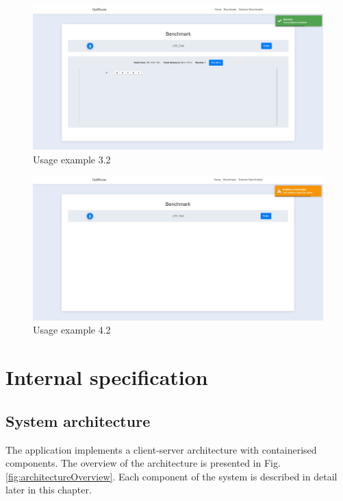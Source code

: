 \documentclass[a4paper,twoside,12pt]{book}
\begin{document}
\begin{figure}[htbp]
\centering
\includegraphics[width=\textwidth]{images/benchmarkSuccess.jpg}
\caption{Usage example 3.2}
\label{fig:benchmarkSuccess}
\end{figure}

\begin{figure}[htbp]
\centering
\includegraphics[width=\textwidth]{images/benchmarkFailed.jpg}
\caption{Usage example 4.2}
\label{fig:benchmarkFailed}
\end{figure}


\chapter{Internal specification}

\section{System architecture}
The application implements a client-server architecture with containerised components. The overview of the architecture is presented in Fig. \ref{fig:architectureOverview}. Each component of the system is described in detail later in this chapter.
\end{document}
